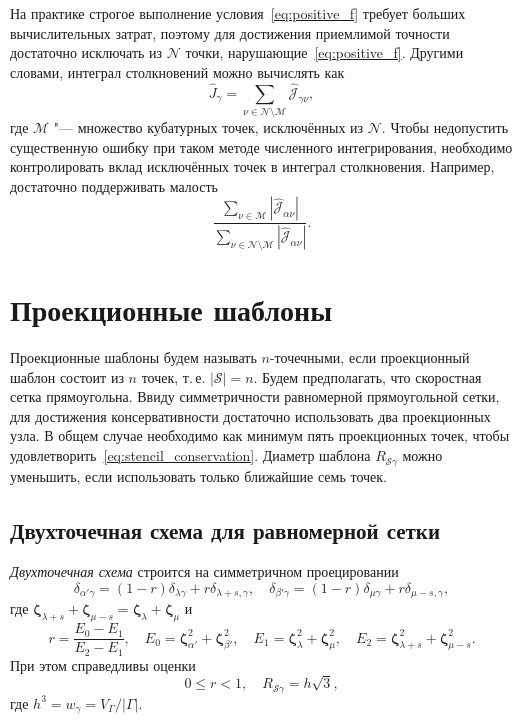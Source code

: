 \documentclass[a4paper,12pt]{article}
\newcommand{\bzeta}{\boldsymbol{\zeta}}
\newcommand{\Nu}{\mathcal{N}}
\begin{document}
На практике строгое выполнение условия~\eqref{eq:positive_f} требует больших вычислительных затрат,
поэтому для достижения приемлимой точности достаточно исключать из \(\Nu\) точки,
нарушающие~\eqref{eq:positive_f}. Другими словами, интеграл столкновений можно вычислять как
\begin{equation}\label{eq:discrete_short_ci_discarded}
    \hat{J}_\gamma = \sum_{\nu\in\Nu\setminus\mathcal{M}} \hat{\mathscr{J}}_{\gamma\nu},
\end{equation}
где \(\mathcal{M}\) "--- множество кубатурных точек, исключённых из \(\Nu\).
Чтобы недопустить существенную ошибку при таком методе численного интегрирования,
необходимо контролировать вклад исключённых точек в интеграл столкновения.
Например, достаточно поддерживать малость
\begin{equation}\label{eq:excluded_contribution}
    \frac{\sum_{\nu\in\mathcal{M}} \left| \hat{\mathscr{J}}_{\alpha\nu} \right|}
        {\sum_{\nu\in\Nu\setminus\mathcal{M}} \left| \hat{\mathscr{J}}_{\alpha\nu} \right|}.
\end{equation}

\section{Проекционные шаблоны}

Проекционные шаблоны будем называть \(n\)-точечными,
если проекционный шаблон состоит из \(n\) точек, т.\,е. \(|\mathcal{S}|=n\).
Будем предполагать, что скоростная сетка прямоугольна.
Ввиду симметричности равномерной прямоугольной сетки,
для достижения консервативности достаточно использовать два проекционных узла.
В общем случае необходимо как минимум пять проекционных точек,
чтобы удовлетворить~\eqref{eq:stencil_conservation}.
Диаметр шаблона \(R_{\mathcal{S}\gamma}\) можно уменьшить,
если использовать только ближайшие семь точек.

\subsection{Двухточечная схема для равномерной сетки}

\emph{Двухточечная схема} строится на симметричном проецировании
\begin{equation}\label{eq:uniform_projection}
    \delta_{\alpha'\gamma} = (1-r)\delta_{\lambda\gamma} + r\delta_{\lambda+s,\gamma}, \quad
    \delta_{\beta'\gamma} = (1-r)\delta_{\mu\gamma} + r\delta_{\mu-s,\gamma},
\end{equation}
где \(\bzeta_{\lambda+s} + \bzeta_{\mu-s} = \bzeta_{\lambda} + \bzeta_{\mu}\) и
\begin{equation}\label{eq:stencil_weights2}
    r = \frac{E_0-E_1}{E_2-E_1}, \quad
    E_0 = \bzeta_{\alpha'}^2 + \bzeta_{\beta'}^2, \quad
    E_1 = \bzeta_{\lambda}^2 + \bzeta_{\mu}^2, \quad
    E_2 = \bzeta_{\lambda+s}^2 + \bzeta_{\mu-s}^2.
\end{equation}
При этом справедливы оценки
\begin{equation}\label{eq:weights_ranges2}
    0 \leq r < 1, \quad R_{\mathcal{S}\gamma} = h\sqrt{3},
\end{equation}
где \(h^3 = w_\gamma = V_\Gamma/|\Gamma|\).
\end{document}
